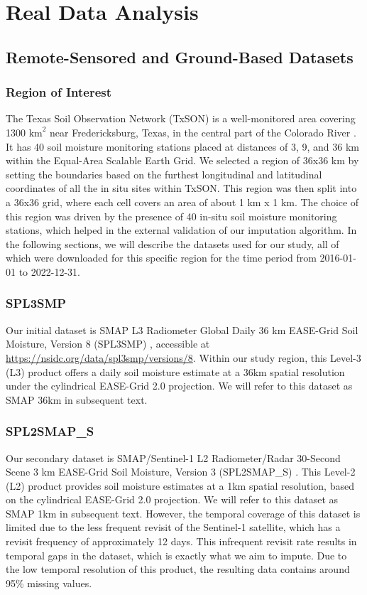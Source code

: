 \documentclass[11pt]{article}
\begin{document}
\section{Real Data Analysis}
\subsection{Remote-Sensored and Ground-Based Datasets}

\subsubsection*{Region of Interest}

The Texas Soil Observation Network (TxSON) is a well-monitored area covering 1300 $\text{km}^2$ near Fredericksburg, Texas, in the central part of the Colorado River \citep{caldwell2019texas}. It has 40 soil moisture monitoring stations placed at distances of 3, 9, and 36 km within the Equal-Area Scalable Earth Grid. We selected a region of 36x36 km by setting the boundaries based on the furthest longitudinal and latitudinal coordinates of all the in situ sites within TxSON. This region was then split into a 36x36 grid, where each cell covers an area of about 1 km x 1 km. The choice of this region was driven by the presence of 40 in-situ soil moisture monitoring stations, which helped in the external validation of our imputation algorithm. In the following sections, we will describe the datasets used for our study, all of which were downloaded for this specific region for the time period from 2016-01-01 to 2022-12-31.

\subsubsection*{SPL3SMP}

Our initial dataset is SMAP L3 Radiometer Global Daily 36 km EASE-Grid Soil Moisture, Version 8 (SPL3SMP) \citep{o2021smap}, accessible at \url{https://nsidc.org/data/spl3smp/versions/8}. Within our study region, this Level-3 (L3) product offers a daily soil moisture estimate at a 36km spatial resolution under the cylindrical EASE-Grid 2.0 \citep{brodzik2012ease} projection. We will refer to this dataset as SMAP 36km in subsequent text.

\subsubsection*{SPL2SMAP\_S}
Our secondary dataset is SMAP/Sentinel-1 L2 Radiometer/Radar 30-Second Scene 3 km EASE-Grid Soil Moisture, Version 3 (SPL2SMAP\_S) \citep{das2019smap}. This Level-2 (L2) product provides soil moisture estimates at a 1km spatial resolution, based on the cylindrical EASE-Grid 2.0 \citep{brodzik2012ease} projection. We will refer to this dataset as SMAP 1km in subsequent text. However, the temporal coverage of this dataset is limited due to the less frequent revisit of the Sentinel-1 satellite, which has a revisit frequency of approximately 12 days. This infrequent revisit rate results in temporal gaps in the dataset, which is exactly what we aim to impute. Due to the low temporal resolution of this product, the resulting data contains around 95\% missing values.
\end{document}
